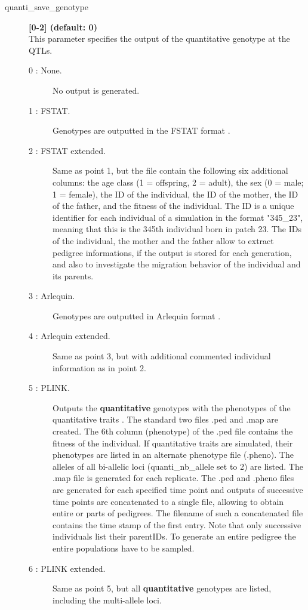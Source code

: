 \documentclass[letterpaper,12pt,oneside]{book}
\begin{document}
\begin{description} 
\item[quanti\_save\_genotype] \textbf{[0-2] (default: 0)} \\
This parameter specifies the output of the quantitative genotype at the QTLs.
\begin{description}
\item [0 : None.] No output is generated.
\item [1 : FSTAT.] Genotypes are outputted in the FSTAT format \citep{Goudet_1995}. 
\item [2 : FSTAT extended.] Same as point 1, but the file contain the following six additional columns: the age class (1 = offspring, 2 = adult), the sex (0 = male; 1 = female), the ID of the individual, the ID of the mother, the ID of the father, and the fitness of the individual. The ID is a unique identifier for each individual of a simulation in the format "345\_23", meaning that this is the 345th individual born in patch 23. The IDs of the individual, the mother and the father allow to extract pedigree informations, if the output is stored for each generation, and also to investigate the migration behavior of the individual and its parents. 
\item [3 : Arlequin.] Genotypes are outputted in Arlequin format \citep{Excoffier_2010}.
\item [4 : Arlequin extended.] Same as point 3, but with additional commented individual information as in point 2. 
\item [5 : PLINK.] Outputs the \textbf{quantitative} genotypes with the phenotypes of the quantitative traits \citep{Purcell_2007}. The standard two files .ped and .map are created. The 6th column (phenotype) of the .ped file contains the fitness of the individual. If quantitative traits are simulated, their phenotypes are listed in an alternate phenotype file (.pheno). The alleles of all bi-allelic loci (\textsf{quanti\_nb\_allele} set to 2) are listed. The .map file is generated for each replicate. The .ped and .pheno files are generated for each specified time point and outputs of successive time points are concatenated to a single file, allowing to obtain entire or parts of pedigrees. The filename of such a concatenated file contains the time stamp of the first entry. Note that only successive individuals list their parentIDs. To generate an entire pedigree the entire populations have to be sampled. 
\item [6 : PLINK extended.] Same as point 5, but all \textbf{quantitative} genotypes are listed, including the multi-allele loci.
\end{description} 


\end{description}
\end{document}

